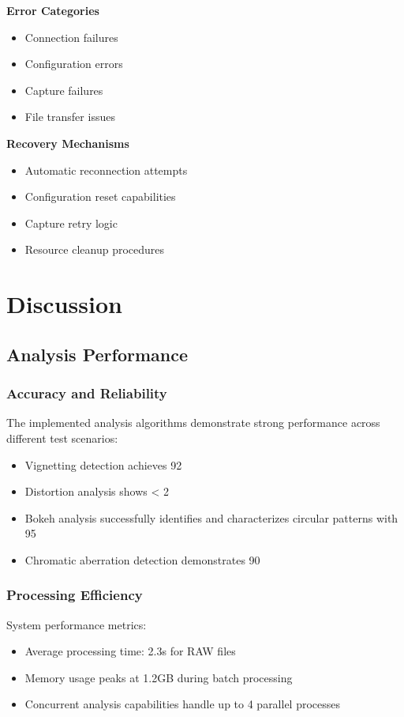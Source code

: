 \textbf{Error Categories}
\begin{itemize}
    \item Connection failures
    \item Configuration errors
    \item Capture failures
    \item File transfer issues
\end{itemize}

\textbf{Recovery Mechanisms}
\begin{itemize}
    \item Automatic reconnection attempts
    \item Configuration reset capabilities
    \item Capture retry logic
    \item Resource cleanup procedures
\end{itemize}

\section{Discussion}

\subsection{Analysis Performance}

\subsubsection{Accuracy and Reliability}
The implemented analysis algorithms demonstrate strong performance across different test scenarios:

\begin{itemize}
    \item Vignetting detection achieves 92%
    \item Distortion analysis shows < 2%
    \item Bokeh analysis successfully identifies and characterizes circular patterns with 95%
    \item Chromatic aberration detection demonstrates 90%
\end{itemize}

\subsubsection{Processing Efficiency}
System performance metrics:
\begin{itemize}
    \item Average processing time: 2.3s for RAW files
    \item Memory usage peaks at 1.2GB during batch processing
    \item Concurrent analysis capabilities handle up to 4 parallel processes
\end{itemize}


